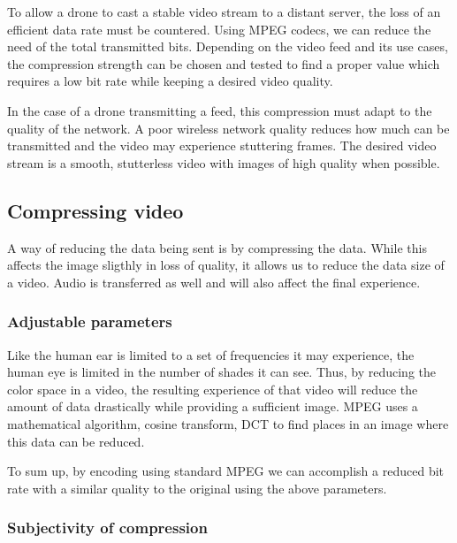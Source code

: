 To allow a drone to cast a stable video stream to a distant server, the loss of an efficient data rate must be countered. Using MPEG codecs, we can reduce the need of the total transmitted bits. Depending on the video feed and its use cases, the compression strength can be chosen and tested to find a proper value which requires a low bit rate while keeping a desired video quality.

In the case of a drone transmitting a feed, this compression must adapt to the quality of the network. A poor wireless network quality reduces how much can be transmitted and the video may experience stuttering frames. The desired video stream is a smooth, stutterless video with images of high quality when possible. 

\subsection{Compressing video}
A way of reducing the data being sent is by compressing the data. While this affects the image sligthly in loss of quality, it allows us to reduce the data size of a video. Audio is transferred as well and will also affect the final experience.

\subsubsection{Adjustable parameters}
Like the human ear is limited to a set of frequencies it may experience, the human eye is limited in the number of shades it can see. Thus, by reducing the color space in a video, the resulting experience of that video will reduce the amount of data drastically while providing a sufficient image. MPEG uses a mathematical algorithm, \textitdiscrete cosine transform, DCT to find places in an image where this data can be reduced.



To sum up, by encoding using standard MPEG we can accomplish a reduced bit rate with a similar quality to the original using the above parameters.

\subsubsection{Subjectivity of compression}

